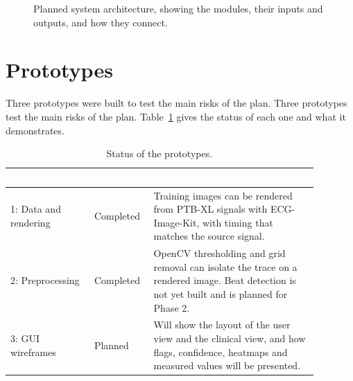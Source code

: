 \begin{figure}[H]
{%
  }
  \caption{Planned system architecture, showing the modules, their inputs and outputs, and how they connect.}
  \label{fig:architecture}
\end{figure}

\section{Prototypes}
\label{sec:prototypes}

Three prototypes were built to test the main risks of the plan.
Three prototypes test the main risks of the plan. Table~\ref{tab:prototypes} gives the status of each one and what it demonstrates.

\begin{table}[H]
  \centering
  \footnotesize
  \setlength{\arrayrulewidth}{0.8pt}
  \renewcommand{\arraystretch}{1.25}
  \caption{Status of the prototypes.}
  \label{tab:prototypes}
  \begin{tabular}{|p{0.25\linewidth}|p{0.14\linewidth}|p{0.49\linewidth}|}
    \hline
    \rowcolor{cyan!90!black}
    \textcolor{white}{\textbf{Prototype}} & \textcolor{white}{\textbf{Status}} &
    \textcolor{white}{\textbf{Demonstrates}} \\
    \hline
    1: Data and rendering & Completed & Training images can be rendered from PTB-XL signals with ECG-Image-Kit, with timing that matches the source signal. \\
    \hline
    2: Preprocessing & Completed & OpenCV thresholding and grid removal can isolate the trace on a rendered image. Beat detection is not yet built and is planned for Phase 2. \\
    \hline
    3: GUI wireframes & Planned & Will show the layout of the user view and the clinical view, and how flags, confidence, heatmaps and measured values will be presented. \\
    \hline
  \end{tabular}
\end{table}

